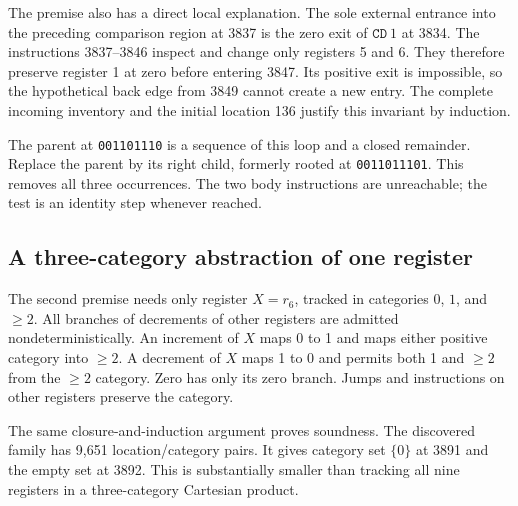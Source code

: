\documentclass[11pt,a4paper]{article}
\theoremstyle{definition}
\newcommand{\CD}{\mathtt{CD}}
\begin{document}
The premise also has a direct local explanation. The sole external entrance into the preceding comparison region at 3837 is the zero exit of $\CD\ 1$ at 3834. The instructions 3837--3846 inspect and change only registers 5 and 6. They therefore preserve register 1 at zero before entering 3847. Its positive exit is impossible, so the hypothetical back edge from 3849 cannot create a new entry. The complete incoming inventory and the initial location 136 justify this invariant by induction.

The parent at \texttt{001101110} is a sequence of this loop and a closed remainder. Replace the parent by its right child, formerly rooted at \texttt{0011011101}. This removes all three occurrences. The two body instructions are unreachable; the test is an identity step whenever reached.

\subsection{A three-category abstraction of one register}

The second premise needs only register $X=r_6$, tracked in categories $0$, $1$, and $\ge2$. All branches of decrements of other registers are admitted nondeterministically. An increment of $X$ maps $0$ to 1 and maps either positive category into $\ge2$. A decrement of $X$ maps 1 to 0 and permits both 1 and $\ge2$ from the $\ge2$ category. Zero has only its zero branch. Jumps and instructions on other registers preserve the category.

The same closure-and-induction argument proves soundness. The discovered family has 9,651 location/category pairs. It gives category set $\{0\}$ at 3891 and the empty set at 3892. This is substantially smaller than tracking all nine registers in a three-category Cartesian product.
\end{document}
